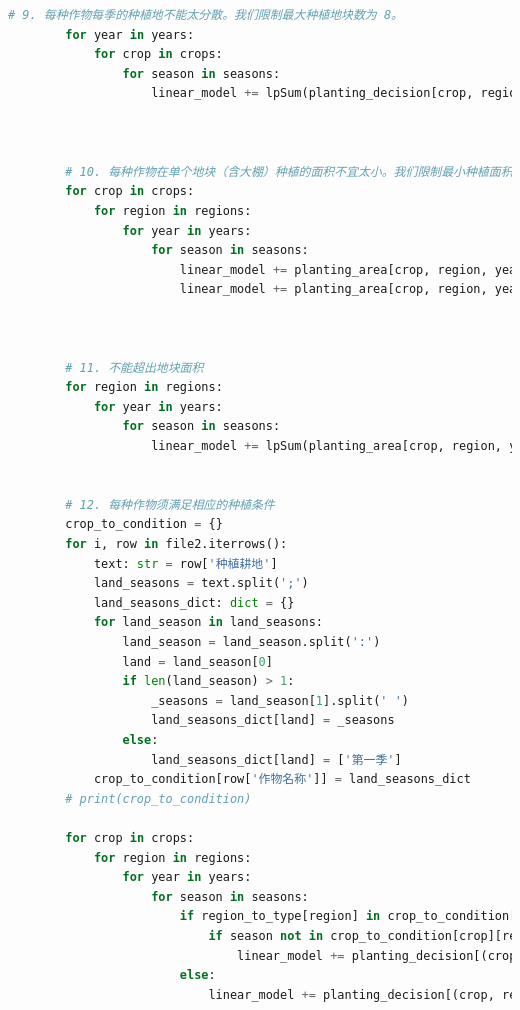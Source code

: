 \documentclass[withoutpreface]{cumcmthesis}
\begin{document}
\begin{appendices}
\begin{lstlisting}[language=python]
        # 9. 每种作物每季的种植地不能太分散。我们限制最大种植地块数为 8。
        for year in years:
            for crop in crops:
                for season in seasons:
                    linear_model += lpSum(planting_decision[crop, region, year, season] for region in regions) <= 8
    
    
    
        # 10. 每种作物在单个地块（含大棚）种植的面积不宜太小。我们限制最小种植面积为 30%。
        for crop in crops:
            for region in regions:
                for year in years:
                    for season in seasons:
                        linear_model += planting_area[crop, region, year, season] >= 0.3 * region_areas[region] * planting_decision[crop, region, year, season]
                        linear_model += planting_area[crop, region, year, season] <= region_areas[region] * planting_decision[crop, region, year, season]
    
            
    
        # 11. 不能超出地块面积
        for region in regions:
            for year in years:
                for season in seasons:
                    linear_model += lpSum(planting_area[crop, region, year, season] for crop in crops) <= region_areas[region]
    
    
        # 12. 每种作物须满足相应的种植条件
        crop_to_condition = {}
        for i, row in file2.iterrows():
            text: str = row['种植耕地']
            land_seasons = text.split(';')
            land_seasons_dict: dict = {}
            for land_season in land_seasons:
                land_season = land_season.split(':')
                land = land_season[0]
                if len(land_season) > 1:
                    _seasons = land_season[1].split(' ')
                    land_seasons_dict[land] = _seasons
                else:
                    land_seasons_dict[land] = ['第一季']
            crop_to_condition[row['作物名称']] = land_seasons_dict
        # print(crop_to_condition)
    
        for crop in crops:
            for region in regions:
                for year in years:
                    for season in seasons:
                        if region_to_type[region] in crop_to_condition[crop]:
                            if season not in crop_to_condition[crop][region_to_type[region]]:
                                linear_model += planting_decision[(crop, region, year, season)] == 0
                        else:
                            linear_model += planting_decision[(crop, region, year, season)] == 0
                            

\end{lstlisting}
\end{appendices}
\end{document}
